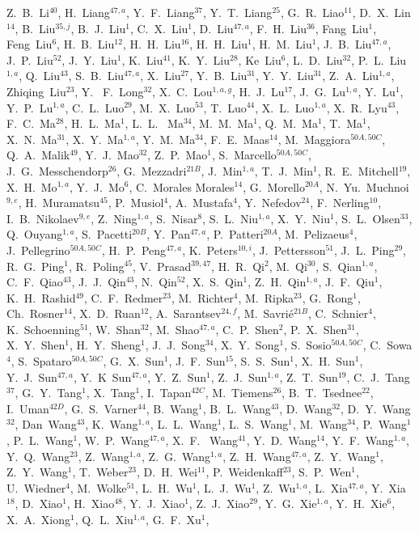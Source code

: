 \documentclass[aps,prd,twocolumn,showpacs,floatfix,byrevtex]{revtex4-1}
\begin{document}
{Z.~B.~Li$^{40}$, H.~Liang$^{47,a}$, Y.~F.~Liang$^{37}$, Y.~T.~Liang$^{25}$, G.~R.~Liao$^{11}$, D.~X.~Lin$^{14}$, B.~Liu$^{35,j}$, B.~J.~Liu$^{1}$, C.~X.~Liu$^{1}$, D.~Liu$^{47,a}$, F.~H.~Liu$^{36}$, Fang~Liu$^{1}$, Feng~Liu$^{6}$, H.~B.~Liu$^{12}$, H.~H.~Liu$^{16}$, H.~H.~Liu$^{1}$, H.~M.~Liu$^{1}$, J.~B.~Liu$^{47,a}$, J.~P.~Liu$^{52}$, J.~Y.~Liu$^{1}$, K.~Liu$^{41}$, K.~Y.~Liu$^{28}$, Ke~Liu$^{6}$, L.~D.~Liu$^{32}$, P.~L.~Liu$^{1,a}$, Q.~Liu$^{43}$, S.~B.~Liu$^{47,a}$, X.~Liu$^{27}$, Y.~B.~Liu$^{31}$, Y.~Y.~Liu$^{31}$, Z.~A.~Liu$^{1,a}$, Zhiqing~Liu$^{23}$, Y. ~F.~Long$^{32}$, X.~C.~Lou$^{1,a,g}$, H.~J.~Lu$^{17}$, J.~G.~Lu$^{1,a}$, Y.~Lu$^{1}$, Y.~P.~Lu$^{1,a}$, C.~L.~Luo$^{29}$, M.~X.~Luo$^{53}$, T.~Luo$^{44}$, X.~L.~Luo$^{1,a}$, X.~R.~Lyu$^{43}$, F.~C.~Ma$^{28}$, H.~L.~Ma$^{1}$, L.~L. ~Ma$^{34}$, M.~M.~Ma$^{1}$, Q.~M.~Ma$^{1}$, T.~Ma$^{1}$, X.~N.~Ma$^{31}$, X.~Y.~Ma$^{1,a}$, Y.~M.~Ma$^{34}$, F.~E.~Maas$^{14}$, M.~Maggiora$^{50A,50C}$, Q.~A.~Malik$^{49}$, Y.~J.~Mao$^{32}$, Z.~P.~Mao$^{1}$, S.~Marcello$^{50A,50C}$, J.~G.~Messchendorp$^{26}$, G.~Mezzadri$^{21B}$, J.~Min$^{1,a}$, T.~J.~Min$^{1}$, R.~E.~Mitchell$^{19}$, X.~H.~Mo$^{1,a}$, Y.~J.~Mo$^{6}$, C.~Morales Morales$^{14}$, G.~Morello$^{20A}$, N.~Yu.~Muchnoi$^{9,e}$, H.~Muramatsu$^{45}$, P.~Musiol$^{4}$, A.~Mustafa$^{4}$, Y.~Nefedov$^{24}$, F.~Nerling$^{10}$, I.~B.~Nikolaev$^{9,e}$, Z.~Ning$^{1,a}$, S.~Nisar$^{8}$, S.~L.~Niu$^{1,a}$, X.~Y.~Niu$^{1}$, S.~L.~Olsen$^{33}$, Q.~Ouyang$^{1,a}$, S.~Pacetti$^{20B}$, Y.~Pan$^{47,a}$, P.~Patteri$^{20A}$, M.~Pelizaeus$^{4}$, J.~Pellegrino$^{50A,50C}$, H.~P.~Peng$^{47,a}$, K.~Peters$^{10,i}$, J.~Pettersson$^{51}$, J.~L.~Ping$^{29}$, R.~G.~Ping$^{1}$, R.~Poling$^{45}$, V.~Prasad$^{39,47}$, H.~R.~Qi$^{2}$, M.~Qi$^{30}$, S.~Qian$^{1,a}$, C.~F.~Qiao$^{43}$, J.~J.~Qin$^{43}$, N.~Qin$^{52}$, X.~S.~Qin$^{1}$, Z.~H.~Qin$^{1,a}$, J.~F.~Qiu$^{1}$, K.~H.~Rashid$^{49}$, C.~F.~Redmer$^{23}$, M.~Richter$^{4}$, M.~Ripka$^{23}$, G.~Rong$^{1}$, Ch.~Rosner$^{14}$, X.~D.~Ruan$^{12}$, A.~Sarantsev$^{24,f}$, M.~Savri\'e$^{21B}$, C.~Schnier$^{4}$, K.~Schoenning$^{51}$, W.~Shan$^{32}$, M.~Shao$^{47,a}$, C.~P.~Shen$^{2}$, P.~X.~Shen$^{31}$, X.~Y.~Shen$^{1}$, H.~Y.~Sheng$^{1}$, J.~J.~Song$^{34}$, X.~Y.~Song$^{1}$, S.~Sosio$^{50A,50C}$, C.~Sowa$^{4}$, S.~Spataro$^{50A,50C}$, G.~X.~Sun$^{1}$, J.~F.~Sun$^{15}$, S.~S.~Sun$^{1}$, X.~H.~Sun$^{1}$, Y.~J.~Sun$^{47,a}$, Y.~K~Sun$^{47,a}$, Y.~Z.~Sun$^{1}$, Z.~J.~Sun$^{1,a}$, Z.~T.~Sun$^{19}$, C.~J.~Tang$^{37}$, G.~Y.~Tang$^{1}$, X.~Tang$^{1}$, I.~Tapan$^{42C}$, M.~Tiemens$^{26}$, B.~T.~Tsednee$^{22}$, I.~Uman$^{42D}$, G.~S.~Varner$^{44}$, B.~Wang$^{1}$, B.~L.~Wang$^{43}$, D.~Wang$^{32}$, D.~Y.~Wang$^{32}$, Dan~Wang$^{43}$, K.~Wang$^{1,a}$, L.~L.~Wang$^{1}$, L.~S.~Wang$^{1}$, M.~Wang$^{34}$, P.~Wang$^{1}$, P.~L.~Wang$^{1}$, W.~P.~Wang$^{47,a}$, X.~F. ~Wang$^{41}$, Y.~D.~Wang$^{14}$, Y.~F.~Wang$^{1,a}$, Y.~Q.~Wang$^{23}$, Z.~Wang$^{1,a}$, Z.~G.~Wang$^{1,a}$, Z.~H.~Wang$^{47,a}$, Z.~Y.~Wang$^{1}$, Z.~Y.~Wang$^{1}$, T.~Weber$^{23}$, D.~H.~Wei$^{11}$, P.~Weidenkaff$^{23}$, S.~P.~Wen$^{1}$, U.~Wiedner$^{4}$, M.~Wolke$^{51}$, L.~H.~Wu$^{1}$, L.~J.~Wu$^{1}$, Z.~Wu$^{1,a}$, L.~Xia$^{47,a}$, Y.~Xia$^{18}$, D.~Xiao$^{1}$, H.~Xiao$^{48}$, Y.~J.~Xiao$^{1}$, Z.~J.~Xiao$^{29}$, Y.~G.~Xie$^{1,a}$, Y.~H.~Xie$^{6}$, X.~A.~Xiong$^{1}$, Q.~L.~Xiu$^{1,a}$, G.~F.~Xu$^{1}$, }
\end{document}
